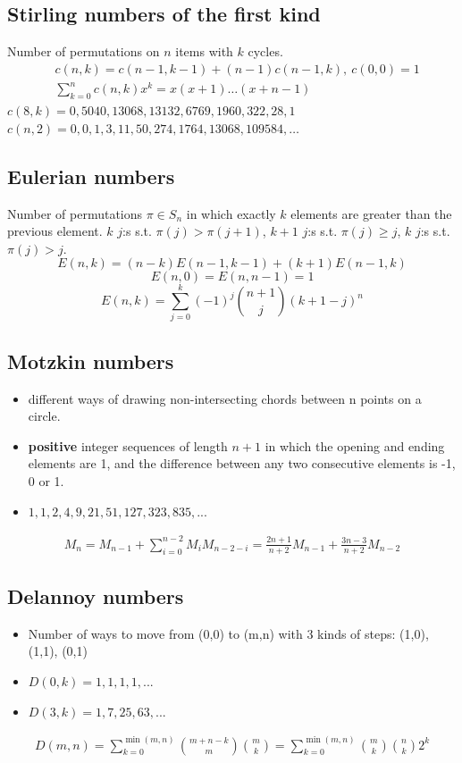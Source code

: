 	\subsection{Stirling numbers of the first kind}
		Number of permutations on $n$ items with $k$ cycles.
		\begin{align*}
			&c(n,k) = c(n-1,k-1) + (n-1) c(n-1,k),\ c(0,0) = 1 \\
			&\textstyle \sum_{k=0}^n c(n,k)x^k = x(x+1) \dots (x+n-1)
		\end{align*}
		$c(8,k) = 0, 5040, 13068, 13132, 6769, 1960, 322, 28, 1$ \\
		$c(n,2) = 0, 0, 1, 3, 11, 50, 274, 1764, 13068, 109584, \dots$

	\subsection{Eulerian numbers}
		Number of permutations $\pi \in S_n$ in which exactly $k$ elements are greater than the previous element. $k$ $j$:s s.t. $\pi(j)>\pi(j+1)$, $k+1$ $j$:s s.t. $\pi(j)\geq j$, $k$ $j$:s s.t. $\pi(j)>j$.
		$$E(n,k) = (n-k)E(n-1,k-1) + (k+1)E(n-1,k)$$
		$$E(n,0) = E(n,n-1) = 1$$
		$$E(n,k) = \sum_{j=0}^k(-1)^j\binom{n+1}{j}(k+1-j)^n$$

	\subsection{Motzkin numbers}
		\begin{itemize}
		    \item different ways of drawing non-intersecting chords between n points on a circle.
		    \item \textbf{positive} integer sequences of length $n + 1$ in which the opening and ending elements are 1, and the difference between any two consecutive elements is -1, 0 or 1.
		    \item $1, 1, 2, 4, 9, 21, 51, 127, 323, 835, ...$
		\end{itemize}
		\begin{align*}
		    M_n = M_{n-1} + \sum_{i=0}^{n-2} M_i M_{n-2-i} = \frac{2n+1}{n+2} M_{n-1} + \frac{3n-3}{n+2} M_{n-2}
		\end{align*}

	\subsection{Delannoy numbers}
		\begin{itemize}
		    \item Number of ways to move from (0,0) to (m,n) with 3 kinds of steps: (1,0), (1,1), (0,1)
		    \item $D(0, k) = 1, 1, 1, 1, ...$
		    \item $D(3, k) = 1, 7, 25, 63, ...$
		\end{itemize}
		\begin{align*}
		    D(m,n) = \sum_{k=0}^{\min(m,n)} \binom{m+n-k}{m} \binom{m}{k} = \sum_{k=0}^{\min(m,n)} \binom{m}{k} \binom{n}{k} 2^k
		\end{align*}

